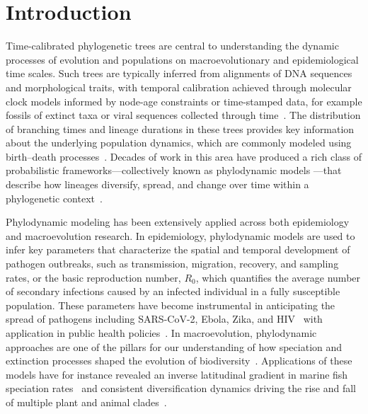\section{Introduction}

Time-calibrated phylogenetic trees are central to understanding the dynamic processes of evolution and populations on macroevolutionary and epidemiological time scales. 
Such trees are typically inferred from alignments of DNA sequences and morphological traits, with temporal calibration achieved through molecular clock models informed by node-age constraints or time-stamped data, for example fossils of extinct taxa or viral sequences collected through time~\cite{stadler2024decoding}. 
The distribution of branching times and lineage durations in these trees provides key information about the underlying population dynamics, which are commonly modeled using birth--death processes~\cite{nee1994reconstructed, ricklefs2007estimating, gernhardConditionedReconstructedProcess2008}. 
Decades of work in this area have produced a rich class of probabilistic frameworks---collectively known as phylodynamic models \citep{stadler2024decoding} ---that describe how lineages diversify, spread, and change over time within a phylogenetic context~\cite{Stadler_2013review, morlon2014phylogenetic, featherstone2022epidemiological}.

Phylodynamic modeling has been extensively applied across both epidemiology and macroevolution research. 
In epidemiology, phylodynamic models are used to infer key parameters that characterize the spatial and temporal development of pathogen outbreaks, such as transmission, migration, recovery, and sampling rates, or the basic reproduction number, \( R_0 \), which quantifies the average number of secondary infections caused by an infected individual in a fully susceptible population. 
These parameters have become instrumental in anticipating the spread of pathogens including SARS-CoV-2, Ebola, Zika, and HIV~\cite{stadler2014insights, vasylyeva2019tracing, giovanetti2020genomic, seemann2020tracking, guinat2023bayesian} with application in public health policies~\cite{rife2017phylodynamic}. 
In macroevolution, phylodynamic approaches are one of the pillars for our understanding of how speciation and extinction processes shaped the evolution of biodiversity~\cite{stadler2013can, morlon2014phylogenetic, morlon2024phylogenetic}. 
Applications of these models have for instance revealed an inverse latitudinal gradient in marine fish speciation rates~\cite{rabosky2018inverse} and consistent diversification dynamics driving the rise and fall of multiple plant and animal clades~\cite{quintero2025loss}. 

